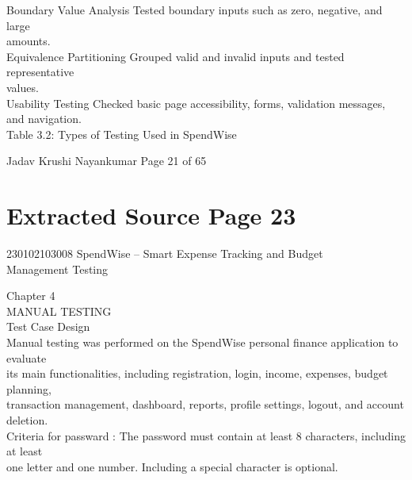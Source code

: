 \documentclass[12pt,a4paper]{report}
\begin{document}
\smallskip
Boundary Value Analysis         Tested boundary inputs such as zero, negative, and large\\ 
amounts.\\ 

\smallskip
Equivalence Partitioning        Grouped valid and invalid inputs and tested representative\\ 
values.\\ 

\smallskip
Usability Testing               Checked basic page accessibility, forms, validation messages,\\ 
and navigation.\\ 

\smallskip
Table 3.2: Types of Testing Used in SpendWise\\ 

\smallskip

\smallskip

\smallskip

\smallskip
Jadav Krushi Nayankumar                                                          Page 21 of 65\\ 

\clearpage
\section*{Extracted Source Page 23}
230102103008                            SpendWise – Smart Expense Tracking and Budget\\ 
Management Testing\\ 

\smallskip

\smallskip

\smallskip
Chapter 4\\ 

\smallskip
MANUAL TESTING\\ 

 Test Case Design\\ 

\smallskip
Manual testing was performed on the SpendWise personal finance application to evaluate\\ 
its main functionalities, including registration, login, income, expenses, budget planning,\\ 
transaction management, dashboard, reports, profile settings, logout, and account deletion.\\ 
Criteria for passward : The password must contain at least 8 characters, including at least\\ 
one letter and one number. Including a special character is optional.\\ 
\end{document}
